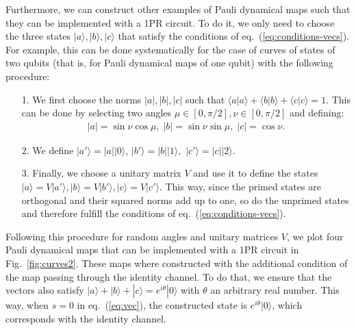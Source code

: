 \documentclass[10pt,letterpaper]{article} %
\newcommand{\fref}[1]{Fig.~\ref{#1}}
\newcommand{\eref}[1]{eq.~(\ref{#1})}
\begin{document}
Furthermore, we can construct other examples of 
Pauli dynamical maps such that they
can be implemented with a 1PR circuit.
To do it, we only need to choose the three states $|a\rangle, |b\rangle, |c\rangle$
that satisfy the conditions of  \eref{eq:conditions-vecs}.
For example, this can be done systematically for the case of curves of states of two qubits
(that is, for Pauli dynamical maps of one qubit)
with the following procedure:
\begin{itemize}
\item[1.] We first choose the norms $|a|, |b|, |c|$
such that $\langle a| a\rangle + \langle b| b\rangle + \langle c| c\rangle = 1$. 
This can be done by selecting two angles
$\mu \in [0, \pi/2] , \nu \in [0,\pi/2]$ and defining:
\begin{align*}
|a| = \sin \nu \cos \mu, \; |b| = \sin \nu \sin \mu , \; |c| = \cos \nu.
\end{align*}
\item[2.] We define $|a'\rangle = |a| |0\rangle$, $|b'\rangle = |b| |1\rangle,$ $|c'\rangle = |c| |2\rangle$.
\item[3.] Finally, we choose a unitary matrix $V$ 
and use it to define the states $|a\rangle = V |a'\rangle, |b\rangle = V |b'\rangle, |c\rangle = V |c'\rangle$.
This way, since the primed states are orthogonal and their squared norms add up to one,
so do the unprimed states and therefore 
fulfill the conditions of  \eref{eq:conditions-vecs}. 
\end{itemize}

Following this procedure for random
angles and unitary matrices $V$, 
we plot four Pauli dynamical maps 
that can be implemented with a 1PR circuit in \fref{fig:curves2}.
These maps where constructed with the additional condition
of the map passing through the identity channel.
To do that, we ensure that the vectors also satisfy
$|a\rangle + |b\rangle + |c\rangle = e^{i \theta}|0\rangle$ with $\theta$ an arbitrary
real number.
This way, when $s = 0$ in \eref{eq:vec}, the constructed state
is $e^{i \theta}|0\rangle$, which
corresponds with the identity channel.
\end{document}
